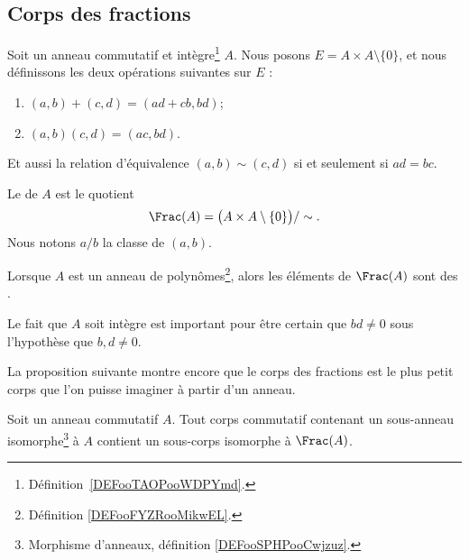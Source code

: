 \subsection{Corps des fractions}

\begin{definition}       \label{DEFooGJYXooOiJQvP}
    Soit un anneau commutatif et intègre\footnote{Définition~\ref{DEFooTAOPooWDPYmd}.} \( A\). Nous posons \( E=A\times A\setminus\{ 0 \}\), et nous définissons les deux opérations suivantes sur \( E\) :
    \begin{enumerate}
        \item       \label{ITEMooWBWHooYsXFkO}
            \( (a,b)+(c,d)=(ad+cb,bd)\);
        \item       \label{ITEMooGOOIooCHqLRl}
            \( (a,b)(c,d)=(ac,bd)\).
    \end{enumerate}
    Et aussi la relation d'équivalence \( (a,b)\sim(c,d)\) si et seulement si \( ad=bc\).

    Le  de \( A\) est le quotient
    \begin{equation}
        \Frac(A)=\big( A\times A\setminus\{ 0 \} \big)/\sim.
    \end{equation}
    Nous notons \( a/b\) la classe de \( (a,b)\).

    Lorsque \( A\) est un anneau de polynômes\footnote{Définition \ref{DEFooFYZRooMikwEL}.}, alors les éléments de \( \Frac(A)\) sont des .
\end{definition}
Le fait que \( A\) soit intègre est important pour être certain que \( bd\neq 0\) sous l'hypothèse que \( b,d\neq 0\).

La proposition suivante montre encore que le corps des fractions est le plus petit corps que l'on puisse imaginer à partir d'un anneau.
\begin{proposition}       \label{PROPooIJBEooDjsoHr}
    Soit un anneau commutatif \( A\). Tout corps commutatif contenant un sous-anneau isomorphe\footnote{Morphisme d'anneaux, définition \ref{DEFooSPHPooCwjzuz}.} à \( A\) contient un sous-corps isomorphe à \( \Frac(A)\).
\end{proposition}

